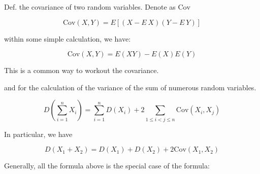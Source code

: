 \documentclass[a4paper, 10pt]{ctexart} %
\begin{document}







 Def. the covariance of two random variables. Denote as $\mathrm{Cov}$

 $$\mathrm{Cov} \left(X,  Y\right)  = E\left[ \left(X  - E\ X\right) \left(Y  - E\ Y\right) \right]$$

 within some simple calculation, we have:

 $$\mathrm{Cov} \left(X, Y\right) =  E \left(X Y\right) - E \left(X \right)  E \left(Y\right)$$

 This is a common way to workout the covariance. 

 and for the calculation of the variance of the sum of numerous random variables. 

 $$D \left(\sum_{i=1} ^{n} X_{i}\right) = \sum_{i=1} ^{n}D \left( X _{i}\right) +2  \sum_{1 \le i < j \le n}  \mathrm{Cov} \left(X _{i}, X_{j}\right)$$

 In particular, we have 

 $$ D \left(X _{1}  + X_{2} \right) = D \left(X_{1} \right) + D \left(X_{2}\right) + 2 \mathrm{Cov} \left(X_{1} , X_{2}\right)$$

 Generally, all the formula above is the special case of the formula: 
\end{document}
